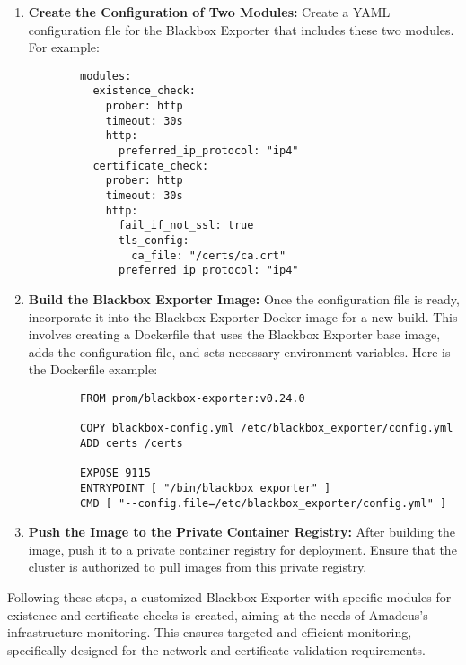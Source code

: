 \begin{enumerate}
    \item \textbf{Create the Configuration of Two Modules:}
    Create a YAML configuration file for the Blackbox Exporter that includes these two modules. For example:
      \begin{lstlisting}
        modules:
          existence_check:
            prober: http
            timeout: 30s
            http:
              preferred_ip_protocol: "ip4"
          certificate_check: 
            prober: http
            timeout: 30s
            http:
              fail_if_not_ssl: true
              tls_config:
                ca_file: "/certs/ca.crt"
              preferred_ip_protocol: "ip4"
      \end{lstlisting}
    \item \textbf{Build the Blackbox Exporter Image:}
    Once the configuration file is ready, incorporate it into the Blackbox Exporter Docker image for a new build. This involves creating a Dockerfile that uses the Blackbox Exporter base image, adds the configuration file, and sets necessary environment variables. Here is the Dockerfile example: 
      \begin{lstlisting}
        FROM prom/blackbox-exporter:v0.24.0

        COPY blackbox-config.yml /etc/blackbox_exporter/config.yml
        ADD certs /certs

        EXPOSE 9115
        ENTRYPOINT [ "/bin/blackbox_exporter" ]
        CMD [ "--config.file=/etc/blackbox_exporter/config.yml" ]
      \end{lstlisting}
    \item \textbf{Push the Image to the Private Container Registry:}
    After building the image, push it to a private container registry for deployment. Ensure that the cluster is authorized to pull images from this private registry. 
\end{enumerate}

Following these steps, a customized Blackbox Exporter with specific modules for existence and certificate checks is created, aiming at the needs of Amadeus's infrastructure monitoring. This ensures targeted and efficient monitoring, specifically designed for the network and certificate validation requirements. 

